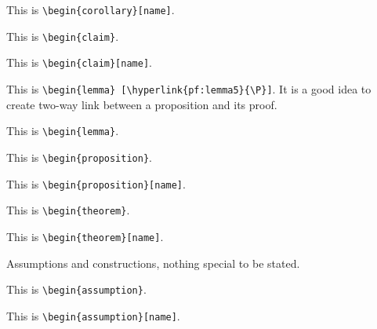 \begin{corollary}
[name]
This is \texttt{\textbackslash begin\{corollary\}[name]}.
\end{corollary}

\begin{claim}
This is \texttt{\textbackslash begin\{claim\}}.
\end{claim}

\begin{claim}
[name]
This is \texttt{\textbackslash begin\{claim\}[name]}.
\end{claim}

\begin{lemma}
\label{lem:lemma5}
This is \texttt{\textbackslash begin\{lemma\}%
[\textbackslash hyperlink\{pf:lemma5\}\{\textbackslash P\}]}.
It is a good idea to create two-way link between
a proposition and its proof.
\end{lemma}

\begin{lemma}
This is \texttt{\textbackslash begin\{lemma\}}.
\end{lemma}

\begin{proposition}
This is \texttt{\textbackslash begin\{proposition\}}.
\end{proposition}

\begin{proposition}
[name]
This is \texttt{\textbackslash begin\{proposition\}[name]}.
\end{proposition}

\begin{theorem}
This is \texttt{\textbackslash begin\{theorem\}}.
\end{theorem}

\begin{theorem}
[name]
\label{thm:theorem10}
This is \texttt{\textbackslash begin\{theorem\}[name]}.
\end{theorem}

\noindent
Assumptions and constructions, nothing special to be stated.

\begin{assumption}
This is \texttt{\textbackslash begin\{assumption\}}.
\end{assumption}

\begin{assumption}
[name]
This is \texttt{\textbackslash begin\{assumption\}[name]}.
\end{assumption}

